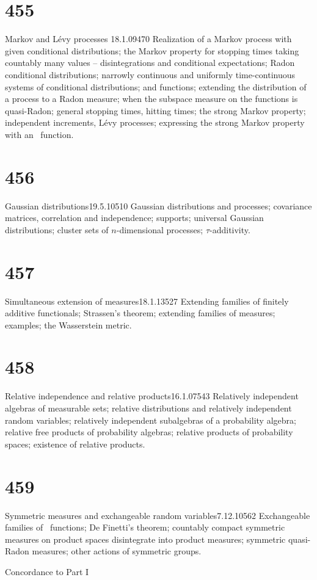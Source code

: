 \section{455}{Markov and L\'evy processes}
{18.1.09}{470}{}
{Realization of a Markov process with given
conditional distributions;  the Markov property for stopping times taking
countably many values -- disintegrations and conditional expectations;
Radon conditional distributions;  narrowly continuous and uniformly
time-continuous systems of conditional distributions;  \cadlag{}
and \callal{} functions;  extending the distribution of a process to a
Radon measure;  when the subspace
measure on the \cadlag{} functions is quasi-Radon;
general stopping times, hitting times;  the strong Markov property;
independent
increments, L\'evy processes;  expressing the strong Markov property 
with an \imp\ function.}

\section{456}{Gaussian distributions}{19.5.10}{510}{}
{Gaussian distributions and processes;  covariance matrices, correlation
and independence;  supports;  universal Gaussian distributions;
cluster sets of $n$-dimensional processes;  $\tau$-additivity.}

\section{457}{Simultaneous extension of measures}{18.1.13}{527}{}
{Extending families of finitely additive functionals;  Strassen's
theorem;  extending families of measures;  examples;  the Wasserstein
metric.}

\section{458}{Relative independence and relative
products}{16.1.07}{543}{}
{Relatively independent algebras of measurable sets;
relative distributions and relatively independent random variables;
relatively independent
subalgebras of a probability algebra;  relative free products of
probability algebras;  relative products of probability spaces;
existence of relative products.}

\section{459}{Symmetric measures and exchangeable random
variables}{7.12.10}{562}{}
{Exchangeable families of \imp\ functions;
De Finetti's theorem;  countably compact symmetric measures on product
spaces disintegrate into product measures;  symmetric quasi-Radon
measures;  other actions of symmetric groups.}


Concordance to Part I 

